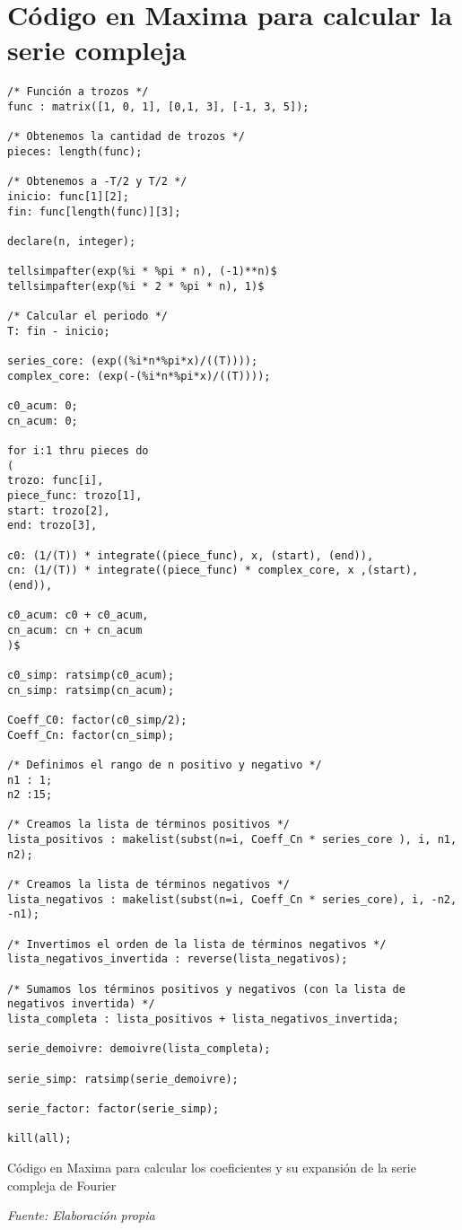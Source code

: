 \section{Código en Maxima para calcular la serie compleja} \label{app3:maxima_complex_proto}
\begin{longlisting}
	\begin{verbatim}
/* Función a trozos */
func : matrix([1, 0, 1], [0,1, 3], [-1, 3, 5]);

/* Obtenemos la cantidad de trozos */
pieces: length(func);

/* Obtenemos a -T/2 y T/2 */
inicio: func[1][2];
fin: func[length(func)][3];

declare(n, integer);

tellsimpafter(exp(%i * %pi * n), (-1)**n)$
tellsimpafter(exp(%i * 2 * %pi * n), 1)$

/* Calcular el periodo */
T: fin - inicio;

series_core: (exp((%i*n*%pi*x)/((T))));
complex_core: (exp(-(%i*n*%pi*x)/((T))));

c0_acum: 0;
cn_acum: 0;

for i:1 thru pieces do
(
trozo: func[i],
piece_func: trozo[1],
start: trozo[2],
end: trozo[3],

c0: (1/(T)) * integrate((piece_func), x, (start), (end)),
cn: (1/(T)) * integrate((piece_func) * complex_core, x ,(start), (end)),

c0_acum: c0 + c0_acum,
cn_acum: cn + cn_acum
)$

c0_simp: ratsimp(c0_acum);
cn_simp: ratsimp(cn_acum);

Coeff_C0: factor(c0_simp/2);
Coeff_Cn: factor(cn_simp);

/* Definimos el rango de n positivo y negativo */
n1 : 1;
n2 :15;

/* Creamos la lista de términos positivos */
lista_positivos : makelist(subst(n=i, Coeff_Cn * series_core ), i, n1, n2);

/* Creamos la lista de términos negativos */
lista_negativos : makelist(subst(n=i, Coeff_Cn * series_core), i, -n2, -n1);

/* Invertimos el orden de la lista de términos negativos */
lista_negativos_invertida : reverse(lista_negativos);

/* Sumamos los términos positivos y negativos (con la lista de negativos invertida) */
lista_completa : lista_positivos + lista_negativos_invertida;

serie_demoivre: demoivre(lista_completa);

serie_simp: ratsimp(serie_demoivre);

serie_factor: factor(serie_simp);

kill(all);
	\end{verbatim}
\caption[Código en Maxima para calcular los coeficientes y su expansión de la serie compleja de Fourier]{Código en Maxima para calcular los coeficientes y su expansión de la serie compleja de Fourier} \textit{Fuente: Elaboración propia}
\end{longlisting}

